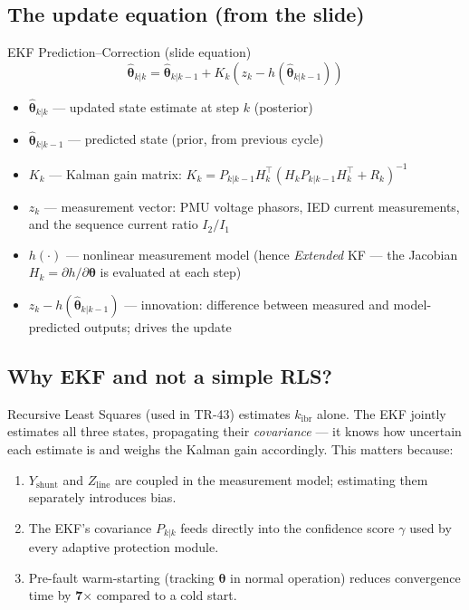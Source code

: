 \documentclass[12pt,a4paper]{article}
\begin{document}
\subsection{The update equation (from the slide)}

\begin{formulabox}{EKF Prediction--Correction (slide equation)}
\begin{equation}
  \hat{\boldsymbol{\theta}}_{k|k} = \hat{\boldsymbol{\theta}}_{k|k-1}
    + K_k\!\left(z_k - h\!\left(\hat{\boldsymbol{\theta}}_{k|k-1}\right)\right)
  \label{eq:ekf}
\end{equation}
\begin{itemize}[nosep]
  \item $\hat{\boldsymbol{\theta}}_{k|k}$ — updated state estimate at step $k$
        (posterior)
  \item $\hat{\boldsymbol{\theta}}_{k|k-1}$ — predicted state (prior, from
        previous cycle)
  \item $K_k$ — Kalman gain matrix: $K_k = P_{k|k-1}H_k^\top
        (H_k P_{k|k-1} H_k^\top + R_k)^{-1}$
  \item $z_k$ — measurement vector: PMU voltage phasors, IED current measurements,
        and the sequence current ratio $I_2/I_1$
  \item $h(\cdot)$ — nonlinear measurement model (hence \emph{Extended} KF — the
        Jacobian $H_k = \partial h/\partial\boldsymbol{\theta}$ is evaluated
        at each step)
  \item $z_k - h(\hat{\boldsymbol{\theta}}_{k|k-1})$ — innovation: difference between
        measured and model-predicted outputs; drives the update
\end{itemize}
\end{formulabox}

\subsection{Why EKF and not a simple RLS?}

Recursive Least Squares (used in TR-43) estimates $k_\mathrm{ibr}$ alone. The EKF
jointly estimates all three states, propagating their \emph{covariance} — it knows
how uncertain each estimate is and weighs the Kalman gain accordingly. This matters
because:
\begin{enumerate}[nosep]
  \item $Y_\mathrm{shunt}$ and $Z_\mathrm{line}$ are coupled in the measurement
        model; estimating them separately introduces bias.
  \item The EKF's covariance $P_{k|k}$ feeds directly into the confidence score
        $\gamma$ used by every adaptive protection module.
  \item Pre-fault warm-starting (tracking $\boldsymbol{\theta}$ in normal operation)
        reduces convergence time by \textbf{7$\times$} compared to a cold start.
\end{enumerate}
\end{document}
